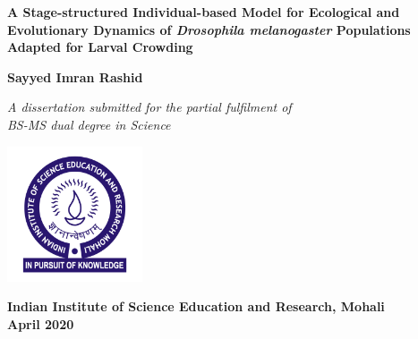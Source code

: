 \begin{titlepage}
  \begin{center}
    \LARGE
    \textbf{A Stage-structured Individual-based Model for Ecological and Evolutionary Dynamics of \textit{Drosophila melanogaster} Populations Adapted for Larval Crowding}

    \vspace{1.5cm}
    \Large
    \textbf{Sayyed Imran Rashid}

    \vfill
    \Large
    \textit{A dissertation submitted for the partial fulfilment of\\
    BS-MS dual degree in Science}

    \vspace{0.8cm}

    \includegraphics[width=0.3\textwidth]{C0/Figs/IISER_Mohali_logo.png}

    \large
    \textbf{Indian Institute of Science Education and Research, Mohali}\\
    \large
    \textbf{April 2020}
  \end{center}
\end{titlepage}
